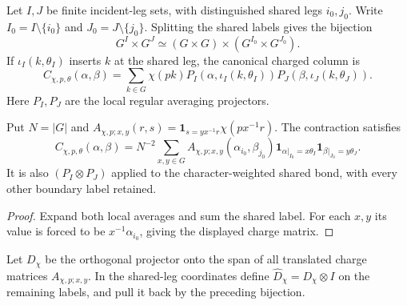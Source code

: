 \begin{definition}
    \label{def:peps_regular_two_site_charge_coordinates}
    Let $I,J$ be finite incident-leg sets, with distinguished shared legs $i_0,j_0$.
    Write $I_0=I\setminus\{i_0\}$ and $J_0=J\setminus\{j_0\}$. Splitting the
    shared labels gives the bijection
    \[
        G^I\times G^J\simeq(G\times G)\times(G^{I_0}\times G^{J_0}).
    \]
    If $\iota_I(k,\theta_I)$ inserts $k$ at the shared leg, the canonical
    charged column is
    \[
        C_{\chi,p,\theta}(\alpha,\beta)=\sum_{k\in G}\chi(pk)
        P_I(\alpha,\iota_I(k,\theta_I))P_J(\beta,\iota_J(k,\theta_J)).
    \]
    Here $P_I,P_J$ are the local regular averaging projectors.
    \leanok
\end{definition}

\begin{lemma}
    \label{thm:peps_regular_two_site_charge_expansion}
    Put $N=|G|$ and
    $A_{\chi,p;x,y}(r,s)=\mathbf1_{s=yx^{-1}r}\chi(px^{-1}r)$.
    The contraction satisfies
    \[
        C_{\chi,p,\theta}(\alpha,\beta)=N^{-2}\sum_{x,y\in G}
        A_{\chi,p;x,y}(\alpha_{i_0},\beta_{j_0})
        \mathbf1_{\alpha|_{I_0}=x\theta_I}
        \mathbf1_{\beta|_{J_0}=y\theta_J}.
    \]
    It is also $(P_I\otimes P_J)$ applied to the character-weighted shared bond,
    with every other boundary label retained.
    \leanok
\end{lemma}
\begin{proof}\leanok
    Expand both local averages and sum the shared label. For each $x,y$ its value
    is forced to be $x^{-1}\alpha_{i_0}$, giving the displayed charge matrix.
\end{proof}

\begin{definition}
    \label{def:peps_regular_two_site_charge_detector}
    Let $D_\chi$ be the orthogonal projector onto the span of all translated charge
    matrices $A_{\chi,p;x,y}$. In the shared-leg coordinates define
    $\widehat D_\chi=D_\chi\otimes I$ on the remaining labels, and pull it
    back by the preceding bijection.
    \leanok
\end{definition}

